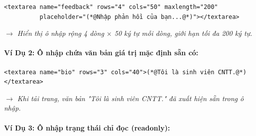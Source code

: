 \documentclass[11pt,oneside]{book}
\begin{document}
\begin{codeWindow}
\begin{lstlisting}[language=HTML5]
<textarea name="feedback" rows="4" cols="50" maxlength="200" 
          placeholder="(*@Nhập phản hồi của bạn...@*)"></textarea>
\end{lstlisting}
\end{codeWindow}

\begin{browserWindow}
\sffamily\small
{} \par\vspace{4pt}
\textcolor{codeComment}{\small\textit{$\rightarrow$ Hiển thị ô nhập rộng 4 dòng $\times$ 50 ký tự mỗi dòng, giới hạn tối đa 200 ký tự.}}
\end{browserWindow}

\paragraph{Ví Dụ 2: Ô nhập chứa văn bản giá trị mặc định sẵn có:}

\begin{codeWindow}
\begin{lstlisting}[language=HTML5]
<textarea name="bio" rows="3" cols="40">(*@Tôi là sinh viên CNTT.@*)</textarea>
\end{lstlisting}
\end{codeWindow}

\begin{browserWindow}
\sffamily\small
\tcbox[arc=2pt, colback=white, colframe=primaryBlue!50, boxsep=2pt, width=0.7\linewidth, height=45pt]{
  \small\textcolor{black}{Tôi là sinh viên CNTT.}
} \par\vspace{4pt}
\textcolor{codeComment}{\small\textit{$\rightarrow$ Khi tải trang, văn bản "Tôi là sinh viên CNTT." đã xuất hiện sẵn trong ô nhập.}}
\end{browserWindow}

\paragraph{Ví Dụ 3: Ô nhập trạng thái chỉ đọc (readonly):}
\end{document}
